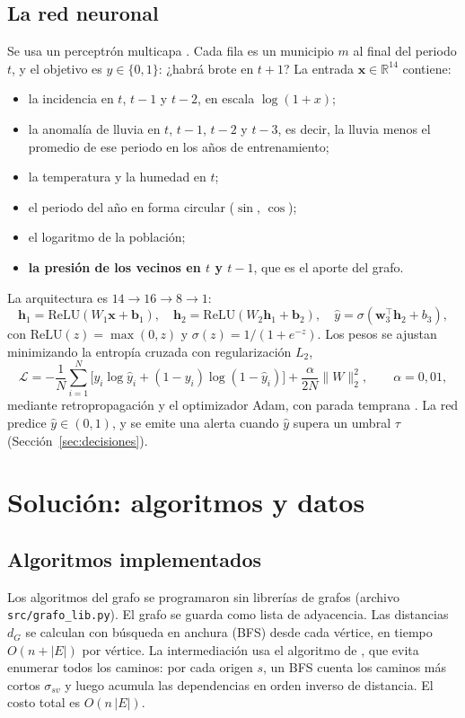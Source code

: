 \documentclass[11pt,letterpaper]{article}
\begin{document}
\subsection{La red neuronal}
Se usa un perceptrón multicapa \citep{goodfellow2016}. Cada fila es un municipio $m$ al final del periodo $t$, y el objetivo es $y\in\{0,1\}$: ¿habrá brote en $t+1$? La entrada $\mathbf{x}\in\mathbb{R}^{14}$ contiene:
\begin{itemize}
  \item la incidencia en $t$, $t-1$ y $t-2$, en escala $\log(1+x)$;
  \item la anomalía de lluvia en $t$, $t-1$, $t-2$ y $t-3$, es decir, la lluvia menos el promedio de ese periodo en los años de entrenamiento;
  \item la temperatura y la humedad en $t$;
  \item el periodo del año en forma circular ($\sin$, $\cos$);
  \item el logaritmo de la población;
  \item \textbf{la presión de los vecinos en $t$ y $t-1$}, que es el aporte del grafo.
\end{itemize}
La arquitectura es $14 \to 16 \to 8 \to 1$:
\begin{equation}
  \mathbf{h}_1=\mathrm{ReLU}(W_1\mathbf{x}+\mathbf{b}_1),\quad
  \mathbf{h}_2=\mathrm{ReLU}(W_2\mathbf{h}_1+\mathbf{b}_2),\quad
  \hat y=\sigma(\mathbf{w}_3^\top\mathbf{h}_2+b_3),
\end{equation}
con $\mathrm{ReLU}(z)=\max(0,z)$ y $\sigma(z)=1/(1+e^{-z})$. Los pesos se ajustan minimizando la entropía cruzada con regularización $L_2$,
\begin{equation}
  \mathcal{L} = -\frac{1}{N}\sum_{i=1}^N \big[y_i\log\hat y_i + (1-y_i)\log(1-\hat y_i)\big] + \frac{\alpha}{2N}\lVert W\rVert_2^2,
  \qquad \alpha = 0{,}01,
\end{equation}
mediante retropropagación y el optimizador Adam, con parada temprana \citep{pedregosa2011}. La red predice $\hat y\in(0,1)$, y se emite una alerta cuando $\hat y$ supera un umbral $\tau$ (Sección~\ref{sec:decisiones}).

\section{Solución: algoritmos y datos}

\subsection{Algoritmos implementados}
Los algoritmos del grafo se programaron sin librerías de grafos (archivo \texttt{src/grafo\_lib.py}). El grafo se guarda como lista de adyacencia. Las distancias $d_G$ se calculan con búsqueda en anchura (BFS) desde cada vértice, en tiempo $O(n+|E|)$ por vértice. La intermediación usa el algoritmo de \citet{brandes2001}, que evita enumerar todos los caminos: por cada origen $s$, un BFS cuenta los caminos más cortos $\sigma_{sv}$ y luego acumula las dependencias en orden inverso de distancia. El costo total es $O(n\,|E|)$.
\end{document}
